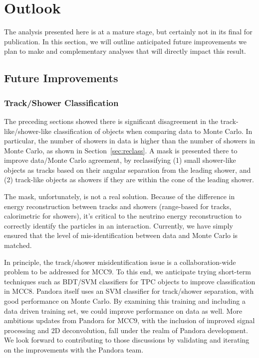 
\section{Outlook}

The analysis presented here is at a mature stage, but certainly not in its final for publication.  In this section, we will outline anticipated future improvements we plan to make and complementary analyses that will directly impact this result.

\subsection{Future Improvements}
\subsubsection{Track/Shower Classification}

The preceding sections showed there is significant disagreement in the track-like/shower-like classification of objects when comparing data to Monte Carlo.  In particular, the number of showers in data is higher than the number of showers in Monte Carlo, as shown in Section~\ref{sec:reclass}.  A mask is presented there to improve data/Monte Carlo agreement, by reclassifying (1) small shower-like objects as tracks based on their angular separation from the leading shower, and (2) track-like objects as showers if they are within the cone of the leading shower.  

The mask, unfortunately, is not a real solution.  Because of the difference in energy reconstruction between tracks and showers (range-based for tracks, calorimetric for showers), it's critical to the neutrino energy reconstruction to correctly identify the particles in an interaction.  Currently, we have simply ensured that the level of mis-identification between data and Monte Carlo is matched.

In principle, the track/shower misidentification issue is a collaboration-wide problem to be addressed for MCC9.  To this end, we anticipate trying short-term techniques such as BDT/SVM classifiers for TPC objects to improve classification in MCC8. Pandora itself uses an SVM classifier for track/shower separation, with good performance on Monte Carlo. By examining this training and including a data driven training set, we could improve performance on data as well. More ambitious updates from Pandora for MCC9, with the inclusion of improved signal processing and 2D deconvolution, fall under the realm of Pandora development.  We look forward to contributing to those discussions by validating and iterating on the improvements with the Pandora team.

